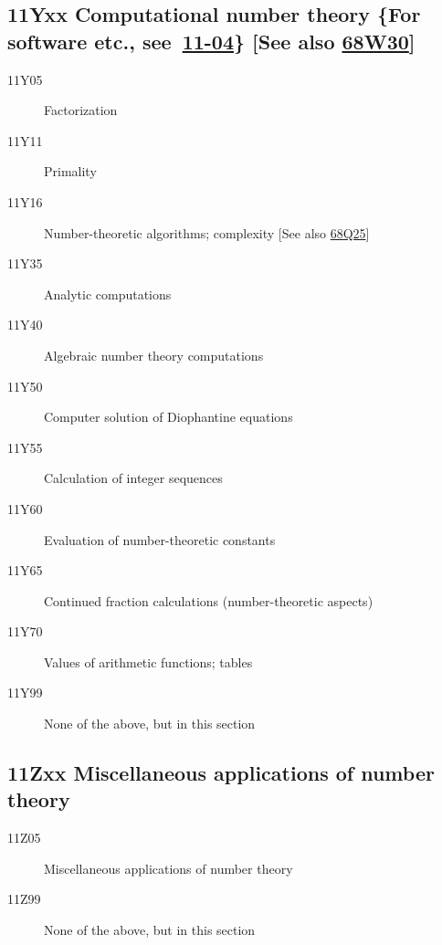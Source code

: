 \subsection*{11Yxx  Computational number theory \{For software etc., see~\hyperref[11-04]{11-04}\} [See also \hyperref[68W30]{68W30}]}\label{11Yxx}
\begin{description}  
\item [11Y05]\label{11Y05} Factorization
\item [11Y11]\label{11Y11} Primality
\item [11Y16]\label{11Y16} Number-theoretic algorithms; complexity [See also \hyperref[68Q25]{68Q25}]
\item [11Y35]\label{11Y35} Analytic computations
\item [11Y40]\label{11Y40} Algebraic number theory computations
\item [11Y50]\label{11Y50} Computer solution of Diophantine equations
\item [11Y55]\label{11Y55} Calculation of integer sequences
\item [11Y60]\label{11Y60} Evaluation of number-theoretic constants 
\item [11Y65]\label{11Y65} Continued fraction calculations (number-theoretic aspects)
\item [11Y70]\label{11Y70} Values of arithmetic functions; tables
\item [11Y99]\label{11Y99} None of the above, but in this section
\end{description}
\subsection*{11Zxx  Miscellaneous applications of number theory }\label{11Zxx}
\begin{description}  
\item [11Z05]\label{11Z05} Miscellaneous applications of number theory
\item [11Z99]\label{11Z99} None of the above, but in this section
\end{description}
